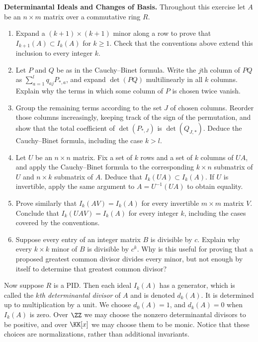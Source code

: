 \documentclass[12pt,reqno]{amsart}
\begin{document}
\hrulefill

\begin{problems}
\item\label{s:minors} \textbf{Determinantal Ideals and Changes of Basis.} Throughout this exercise let $A$ be an $n\times m$ matrix over a commutative ring $R$.
\begin{enumerate}
\item Expand a $(k+1)\times(k+1)$ minor along a row to prove that $I_{k+1}(A)\subset I_k(A)$ for $k\geq1$. Check that the conventions above extend this inclusion to every integer $k$.
\item Let $P$ and $Q$ be as in the Cauchy--Binet formula. Write the $j$th column of $PQ$ as $\sum_{a=1}^lq_{aj}P_{*,a}$, and expand $\det(PQ)$ multilinearly in all $k$ columns. Explain why the terms in which some column of $P$ is chosen twice vanish.
\item Group the remaining terms according to the set $J$ of chosen columns. Reorder those columns increasingly, keeping track of the sign of the permutation, and show that the total coefficient of $\det(P_{*,J})$ is $\det(Q_{J,*})$. Deduce the Cauchy--Binet formula, including the case $k>l$.
\item Let $U$ be an $n\times n$ matrix. Fix a set of $k$ rows and a set of $k$ columns of $UA$, and apply the Cauchy--Binet formula to the corresponding $k\times n$ submatrix of $U$ and $n\times k$ submatrix of $A$. Deduce that $I_k(UA)\subset I_k(A)$. If $U$ is invertible, apply the same argument to $A=U^{-1}(UA)$ to obtain equality.
\item Prove similarly that $I_k(AV)=I_k(A)$ for every invertible $m\times m$ matrix $V$. Conclude that $I_k(UAV)=I_k(A)$ for every integer $k$, including the cases covered by the conventions.
\item Suppose every entry of an integer matrix $B$ is divisible by $c$. Explain why every $k\times k$ minor of $B$ is divisible by $c^k$. Why is this useful for proving that a proposed greatest common divisor divides every minor, but not enough by itself to determine that greatest common divisor?
\end{enumerate}
\end{problems}

\hrulefill

Now suppose $R$ is a PID. Then each ideal $I_k(A)$ has a generator, which is called the \emph{$k$th determinantal divisor} of $A$ and is denoted $d_k(A)$. It is determined up to multiplication by a unit. We choose $d_0(A)=1$, and $d_k(A)=0$ when $I_k(A)$ is zero. Over $\ZZ$ we may choose the nonzero determinantal divisors to be positive, and over $\KK[x]$ we may choose them to be monic. Notice that these choices are normalizations, rather than additional invariants.
\end{document}
